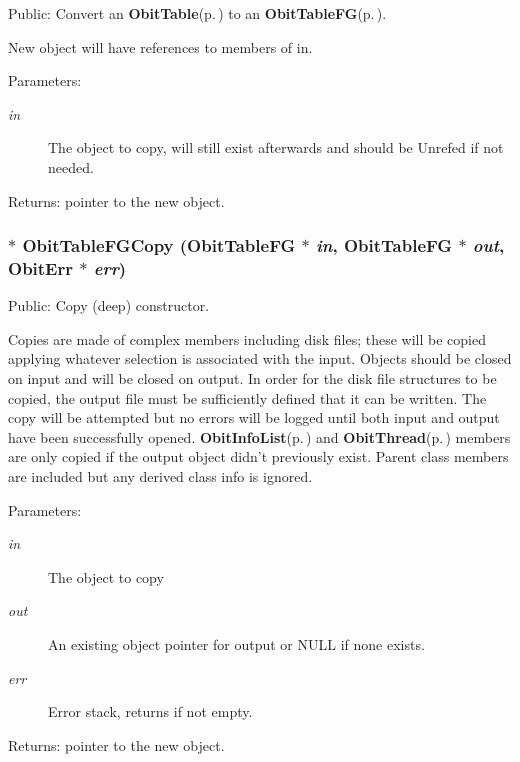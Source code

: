 Public: Convert an {\bf Obit\-Table}{\rm (p.\,\pageref{structObitTable})} to an {\bf Obit\-Table\-FG}{\rm (p.\,\pageref{structObitTableFG})}. 

New object will have references to members of in. \begin{Desc}
\item[Parameters:]
\begin{description}
\item[{\em in}]The object to copy, will still exist afterwards and should be Unrefed if not needed. \end{description}
\end{Desc}
\begin{Desc}
\item[Returns:]pointer to the new object. \end{Desc}
\subsubsection{$\ast$ Obit\-Table\-FGCopy ({\bf Obit\-Table\-FG} $\ast$ {\em in}, {\bf Obit\-Table\-FG} $\ast$ {\em out}, {\bf Obit\-Err} $\ast$ {\em err})}\label{ObitTableFG_8h_a14}


Public: Copy (deep) constructor. 

Copies are made of complex members including disk files; these will be copied applying whatever selection is associated with the input. Objects should be closed on input and will be closed on output. In order for the disk file structures to be copied, the output file must be sufficiently defined that it can be written. The copy will be attempted but no errors will be logged until both input and output have been successfully opened. {\bf Obit\-Info\-List}{\rm (p.\,\pageref{structObitInfoList})} and {\bf Obit\-Thread}{\rm (p.\,\pageref{structObitThread})} members are only copied if the output object didn't previously exist. Parent class members are included but any derived class info is ignored. \begin{Desc}
\item[Parameters:]
\begin{description}
\item[{\em in}]The object to copy \item[{\em out}]An existing object pointer for output or NULL if none exists. \item[{\em err}]Error stack, returns if not empty. \end{description}
\end{Desc}
\begin{Desc}
\item[Returns:]pointer to the new object. \end{Desc}
